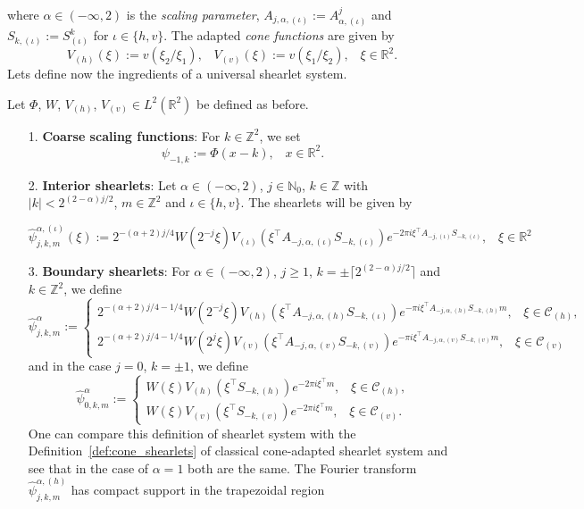 where $\alpha\in (-\infty,2)$ is the \textit{scaling parameter}, $A_{j,\alpha,(\iota)}:=A^j_{\alpha,(\iota)}$ and $S_{k,(\iota)}:=S^k_{(\iota)}$ for $\iota\in\{h,v\}$. The adapted \textit{cone functions} are given by
$$
V_{(h)}(\xi):=v(\xi_2/\xi_1)\textrm{,}\quad V_{(v)}(\xi):=v(\xi_1/\xi_2)\textrm{,}\quad \xi\in\mathbb{R}^2.
$$
Lets define now the ingredients of a universal shearlet system.

\bigskip

\begin{defn}
\label{def:alpha31}
Let $\Phi$, $W$, $V_{(h)}$, $V_{(v)}\in L^2(\mathbb{R}^2)$ be defined as before.
\begin{enumerate}
\item[1.] \textbf{Coarse scaling functions}: For $k\in\mathbb{Z}^2$, we set 
$$
\psi_{-1,k}:=\Phi(x-k)\textrm{,}\quad x\in\mathbb{R}^2.
$$
\item[2.] \textbf{Interior shearlets}: Let $\alpha\in (-\infty,2)$, $j\in\mathbb{N}_0$, $k\in\mathbb{Z}$ with $|k|< 2^{(2-\alpha)j/2}$, $m\in\mathbb{Z}^2$ and $\iota\in\{h,v\}$. The shearlets will be given by 

\begin{equation}
\label{eq:alpha35}
\hat{\psi}^{\alpha,(\iota)}_{j,k,m}(\xi):=2^{-(\alpha+2)j/4}W(2^{-j}\xi)V_{(\iota)}(\xi^{\top} A_{-j,\alpha,(\iota)}S_{-k,(\iota)})e^{-2\pi i\xi^{\top}A_{-j,(\iota)}S_{-k,(\iota)}}\textrm{,}\quad \xi\in\mathbb{R}^2
\end{equation}

\item[3.] \textbf{Boundary shearlets}: For $\alpha\in(-\infty,2)$, $j\geq 1$, $k=\pm\lceil 2^{(2-\alpha)j/2}\rceil$ and $k\in\mathbb{Z}^2$, we define
\begin{equation}
\label{eq:alpha36}
\hat{\psi}_{j,k,m}^{\alpha}:=
\begin{cases}
2^{-(\alpha+2)j/4-1/4}W(2^{-j}\xi)V_{(h)}(\xi^{\top} A_{-j,\alpha,(h)}S_{-k,(\iota)})e^{-\pi i\xi^{\top}A_{-j,\alpha,(h)}S_{-k,(h)}m}\textrm{,}\quad \xi\in\mathcal{C}_{(h)},\\
2^{-(\alpha+2)j/4-1/4}W(2^{j}\xi)V_{(v)}(\xi^{\top}A_{-j,\alpha,(v)}S_{-k,(v)})e^{-\pi i\xi^{\top}A_{-j,\alpha,(v)}S_{-k,(v)}m}\textrm{,}\quad \xi\in\mathcal{C}_{(v)}
\end{cases}
\end{equation}
and in the case $j=0$, $k=\pm 1$, we define
$$
\hat{\psi}^{\alpha}_{0,k,m}:=
\begin{cases}
W(\xi) V_{(h)}(\xi^{\top}S_{-k,(h)})e^{-2\pi i\xi^{\top}m}\textrm{,}\quad \xi\in\mathcal{C}_{(h)}\textrm{,}\\
W(\xi)V_{(v)}(\xi^{\top}S_{-k,(v)})e^{-2\pi i\xi^{\top}m}\textrm{,}\quad \xi\in\mathcal{C}_{(v)}.
\end{cases}
$$
One can compare this definition of shearlet system with the Definition~\ref{def:cone_shearlets} of classical cone-adapted shearlet system and see that in the case of $\alpha = 1$ both are the same. The Fourier transform $\hat{\psi}_{j,k,m}^{\alpha,(h)}$ has compact support in the trapezoidal region


\end{enumerate}
\end{defn}
